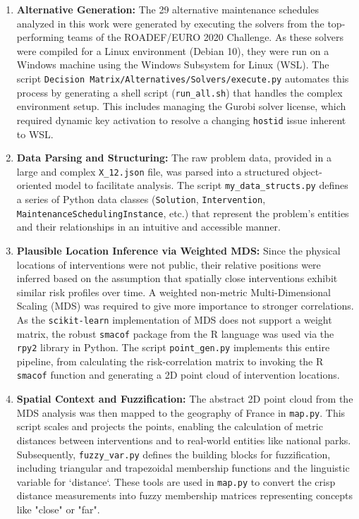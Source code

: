 \begin{enumerate}
    \item \textbf{Alternative Generation:} The 29 alternative maintenance schedules analyzed in this work were generated by executing the solvers from the top-performing teams of the ROADEF/EURO 2020 Challenge. As these solvers were compiled for a Linux environment (Debian 10), they were run on a Windows machine using the Windows Subsystem for Linux (WSL). The script \texttt{Decision Matrix/Alternatives/Solvers/execute.py} automates this process by generating a shell script (\texttt{run\_all.sh}) that handles the complex environment setup. This includes managing the Gurobi solver license, which required dynamic key activation to resolve a changing \texttt{hostid} issue inherent to WSL.

    \item \textbf{Data Parsing and Structuring:} The raw problem data, provided in a large and complex \texttt{X\_12.json} file, was parsed into a structured object-oriented model to facilitate analysis. The script \texttt{my\_data\_structs.py} defines a series of Python data classes (\texttt{Solution}, \texttt{Intervention}, \texttt{MaintenanceSchedulingInstance}, etc.) that represent the problem's entities and their relationships in an intuitive and accessible manner.

    \item \textbf{Plausible Location Inference via Weighted MDS:} Since the physical locations of interventions were not public, their relative positions were inferred based on the assumption that spatially close interventions exhibit similar risk profiles over time. A weighted non-metric Multi-Dimensional Scaling (MDS) was required to give more importance to stronger correlations. As the \texttt{scikit-learn} implementation of MDS does not support a weight matrix, the robust \texttt{smacof} package from the R language was used via the \texttt{rpy2} library in Python. The script \texttt{point\_gen.py} implements this entire pipeline, from calculating the risk-correlation matrix to invoking the R \texttt{smacof} function and generating a 2D point cloud of intervention locations.

    \item \textbf{Spatial Context and Fuzzification:} The abstract 2D point cloud from the MDS analysis was then mapped to the geography of France in \texttt{map.py}. This script scales and projects the points, enabling the calculation of metric distances between interventions and to real-world entities like national parks. Subsequently, \texttt{fuzzy\_var.py} defines the building blocks for fuzzification, including triangular and trapezoidal membership functions and the linguistic variable for `distance`. These tools are used in \texttt{map.py} to convert the crisp distance measurements into fuzzy membership matrices representing concepts like "close" or "far".


\end{enumerate}

